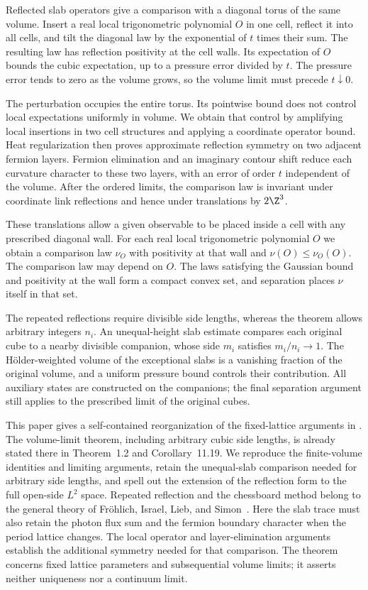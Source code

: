 Reflected slab operators give a comparison with a diagonal torus
of the same volume. Insert a real local trigonometric polynomial
$O$ in one cell, reflect it into all cells, and tilt the diagonal
law by the exponential of $t$ times their sum. The resulting law
has reflection positivity at the cell walls. Its expectation of
$O$ bounds the cubic expectation, up to a pressure error divided
by $t$. The pressure error tends to zero as the volume grows, so
the volume limit must precede $t\downarrow0$.

The perturbation occupies the entire torus. Its pointwise bound
does not control local expectations uniformly in volume. We obtain
that control by amplifying local insertions in two cell structures
and applying a coordinate operator bound. Heat regularization then
proves approximate reflection symmetry on two adjacent fermion
layers. Fermion elimination and an imaginary contour shift reduce
each curvature character to these two layers, with an error of
order $t$ independent of the volume. After the ordered limits,
the comparison law is invariant under coordinate link reflections
and hence under translations by $2\Z^3$.

These translations allow a given observable to be placed inside a
cell with any prescribed diagonal wall. For each real local
trigonometric polynomial $O$ we obtain a comparison law $\nu_O$
with positivity at that wall and
$\nu(O)\le\nu_O(O)$. The comparison law may depend on $O$.
The laws satisfying the Gaussian bound and positivity at the wall
form a compact convex set, and separation places $\nu$ itself in
that set.

The repeated reflections require divisible side lengths, whereas
the theorem allows arbitrary integers $n_i$. An unequal-height
slab estimate compares each original cube to a nearby divisible
companion, whose side $m_i$ satisfies $m_i/n_i\to1$. The H\"older-weighted
volume of the exceptional slabs is a vanishing fraction of the original
volume, and a uniform pressure bound controls their contribution. All auxiliary states
are constructed on the companions; the final separation argument
still applies to the prescribed limit of the original cubes.


This paper gives a self-contained reorganization of the fixed-lattice
arguments in \cite[Sections~3--11]{ChamberQED}. The volume-limit
theorem, including arbitrary cubic side lengths, is already stated
there in Theorem~1.2 and Corollary~11.19. We reproduce the finite-volume
identities and limiting arguments, retain the unequal-slab comparison
needed for arbitrary side lengths, and spell out the extension of the
reflection form to the full open-side $L^2$ space. Repeated reflection and the
chessboard method belong to the general theory of Fr\"ohlich, Israel,
Lieb, and Simon~\cite[Section~4]{FILS1978}. Here the slab trace must also
retain the photon flux sum and the fermion boundary character when
the period lattice changes. The local operator and layer-elimination
arguments establish the additional symmetry needed for that comparison.
The theorem concerns fixed lattice parameters and subsequential volume
limits; it asserts neither uniqueness nor a continuum limit.
